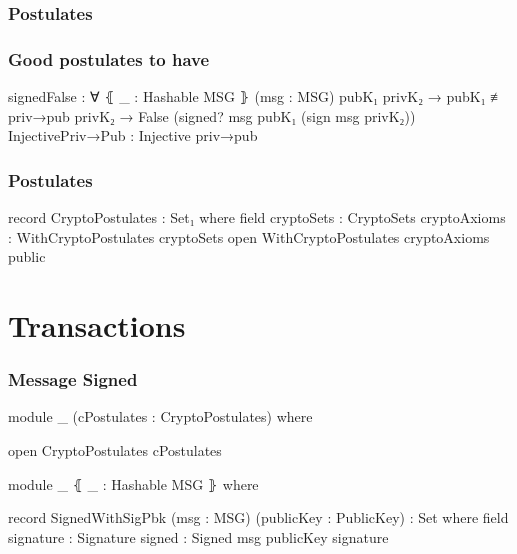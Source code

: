 \documentclass{beamer}
\begin{document}
\begin{frame}
  \frametitle{Postulates}
\end{frame}

\begin{frame}
  \frametitle{Good postulates to have}
\begin{code}
    signedFalse : ∀ ⦃ _ : Hashable MSG ⦄ (msg : MSG)
      pubK₁ privK₂ → pubK₁ ≢ priv→pub privK₂
      → False (signed? msg pubK₁ (sign msg privK₂))
    InjectivePriv→Pub : Injective priv→pub
\end{code}
\end{frame}

\begin{frame}
  \frametitle{Postulates}
\begin{code}
record CryptoPostulates : Set₁ where
  field
    cryptoSets : CryptoSets
    cryptoAxioms : WithCryptoPostulates cryptoSets
  open WithCryptoPostulates cryptoAxioms public

\end{code}
\end{frame}

\section{Transactions}

\begin{frame}
  \frametitle{Message Signed}
\begin{code}
module _ (cPostulates : CryptoPostulates) where

  open CryptoPostulates cPostulates

  module _ ⦃ _ : Hashable MSG ⦄ where

    record SignedWithSigPbk  (msg : MSG)
      (publicKey : PublicKey) : Set where
      field
        signature : Signature
        signed    : Signed msg publicKey signature

\end{code}
\end{frame}
\end{document}
